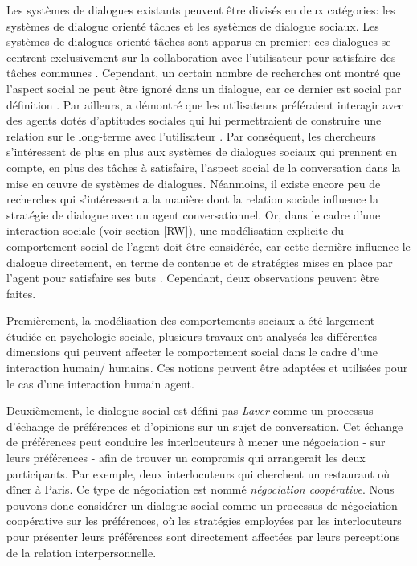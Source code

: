 \documentclass [french]{sig-alternate-05-2015}
\begin{document}
Les systèmes de dialogues existants peuvent être divisés en deux catégories: les systèmes de dialogue orienté tâches et les systèmes de dialogue sociaux. Les systèmes de dialogues orienté tâches sont apparus en premier: ces dialogues se centrent exclusivement sur la collaboration avec l'utilisateur pour satisfaire des tâches communes \cite{allen1995spoken, allen1996robust}. Cependant, un certain nombre de recherches ont montré que l'aspect social ne peut être ignoré dans un dialogue, car ce dernier est social par définition \cite{markopoulos2005case}. Par ailleurs, \cite{moon1998intimate} a démontré que les utilisateurs préféraient interagir avec des agents dotés d'aptitudes sociales qui lui permettraient de construire une relation sur le long-terme avec l'utilisateur \cite{bickmore2005establishing}. Par conséquent, les chercheurs s'intéressent de plus en plus aux systèmes de dialogues sociaux qui prennent en compte, en plus des tâches à satisfaire, l'aspect social de la conversation dans la mise en œuvre de systèmes de dialogues. Néanmoins, il existe encore peu de recherches qui s'intéressent a la manière dont la relation sociale influence la stratégie de dialogue avec un agent conversationnel. Or, dans le cadre d'une interaction  sociale (voir section \ref{RW}), une modélisation explicite du comportement social de l'agent doit être considérée, car cette dernière influence le dialogue directement, en terme de contenue et de stratégies mises en place par l'agent pour satisfaire ses buts \cite{bickmore2012empirical}. Cependant, deux observations peuvent être faites.

\par Premièrement, la modélisation des comportements sociaux a été largement étudiée en psychologie sociale, plusieurs travaux ont analysés les différentes dimensions qui peuvent affecter le comportement social dans le cadre d'une interaction humain/ humains. Ces notions peuvent être adaptées et utilisées pour le cas d'une interaction humain agent.

 \par Deuxièmement, le dialogue social est défini pas \emph{Laver}\cite{laver1981linguistic} comme un processus d'échange de préférences et d'opinions sur un sujet de conversation. Cet échange de préférences peut conduire les interlocuteurs à mener une négociation - sur leurs préférences - afin de trouver un compromis qui arrangerait les deux participants. Par exemple, deux interlocuteurs qui cherchent un restaurant où dîner à Paris. Ce type de négociation est nommé \emph{négociation coopérative}. Nous pouvons donc considérer un dialogue social comme un processus de négociation coopérative sur les préférences, où les stratégies employées par les interlocuteurs pour présenter leurs préférences sont directement affectées par leurs perceptions de la relation interpersonnelle.
\end{document}
